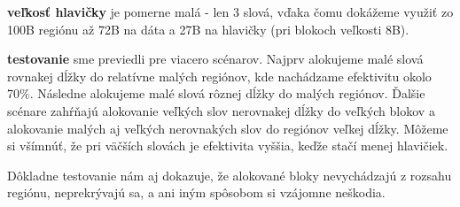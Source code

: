 \documentclass[a4paper,11pt]{article}
\theoremstyle{mytheor}
\begin{document}
\textbf{veľkosť hlavičky} je pomerne malá - len 3 slová, vďaka čomu dokážeme využiť zo 100B regiónu až 72B na dáta a 27B na hlavičky (pri blokoch veľkosti 8B).

\textbf{testovanie} sme previedli pre viacero scénarov. Najprv alokujeme malé slová rovnakej dĺžky do relatívne malých regiónov, kde nachádzame efektivitu okolo 70\%. Následne alokujeme malé slová rôznej dĺžky do malých regiónov. Ďalšie scénare zahŕňajú alokovanie veľkých slov nerovnakej dĺžky do veľkých blokov a alokovanie malých aj veľkých nerovnakých slov do regiónov veľkej dĺžky. Môžeme si všímnúť, že pri väčších slovách je efektivita vyššia, keďže stačí menej hlavičiek.

Dôkladne testovanie nám aj dokazuje, že alokované bloky nevychádzajú z rozsahu regiónu, neprekrývajú sa, a ani iným spôsobom si vzájomne neškodia.
\newpage
\end{document}
